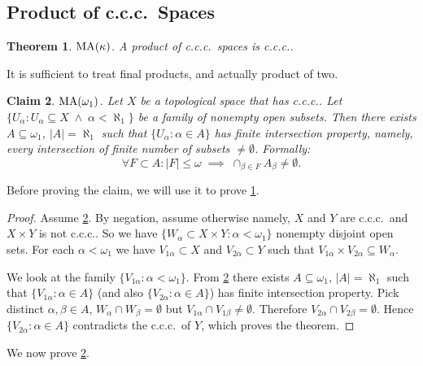 \documentclass[11pt,pdftex,twoside,a4paper]{article}
\newcommand{\MA}{\ensuremath{\mathop{\rm MA}\nolimits}}
\newcommand{\ccc}{c.c.c.}
\newtheorem{thm}{Theorem}[section]
\newtheorem{claim}[thm]{Claim}
\theoremstyle{definition}
\begin{document}
\subsection{Product of \ccc\ Spaces}

\begin{thm} \label{thm:prod:ccc}
\(\MA(\kappa)\).
A product of \ccc\ spaces is \ccc.
\end{thm}
It is sufficient to treat final products, and actually product of two.
\begin{claim} \label{claim:open:subset:finite:sect}
\(\MA(\omega_1)\).
Let $X$ be a topological space that has \ccc.
Let \(\{U_\alpha: U_\alpha\subseteq X \;\land\; \alpha < \aleph_1\}\) 
be a family of nonempty open subsets.
Then there exists \(A \subseteq \omega_1\), \(|A|=\aleph_1\)
such that \(\{U_\alpha: \alpha\in A\}\)
has finite intersection property, 
namely, every intersection of finite number of subsets \(\neq\emptyset\).
Formally:
\begin{equation*}
\forall F\subset A: |F|\leq \omega\;\implies\; 
  \cap_{\beta\in F} A_\beta \neq \emptyset.
\end{equation*}
\end{claim}
Before proving the claim, we will use it to prove \ref{thm:prod:ccc}.
\begin{proof}
Assume \ref{claim:open:subset:finite:sect}.
By negation, assume otherwise namely, $X$ and $Y$ are \ccc\ 
and \(X\times Y\) is not \ccc.
So we have \(\{W_\alpha \subset X\times Y:\alpha<\omega_1\}\)
nonempty disjoint open sets. For each \(\alpha<\omega_1\)
we have \(V_{1\alpha}\subset X\) and \(V_{2\alpha}\subset Y\) such that
\(V_{1\alpha}\times V_{2\alpha} \subseteq W_\alpha \).

We look at the family \(\{V_{1\alpha}:\alpha<\omega_1\}\).
From \ref{claim:open:subset:finite:sect} there exists \(A\subseteq \omega_1\),
\(|A|=\aleph_1\) such that \(\{V_{1\alpha}:\alpha\in A\}\)
(and also  \(\{V_{2\alpha}:\alpha\in A\}\))
has finite intersection property.
Pick distinct \(\alpha,\beta\in A\), \(W_\alpha\cap W_\beta=\emptyset\)
but \(V_{1\alpha}\cap V_{1\beta} \neq \emptyset\). Therefore 
\(V_{2\alpha}\cap V_{2\beta} = \emptyset\).
Hence \(\{V_{2\alpha}:\alpha\in A\}\) contradicts the \ccc\ of $Y$,
which proves the theorem.
\end{proof}
We now prove \ref{claim:open:subset:finite:sect}.
\end{document}
